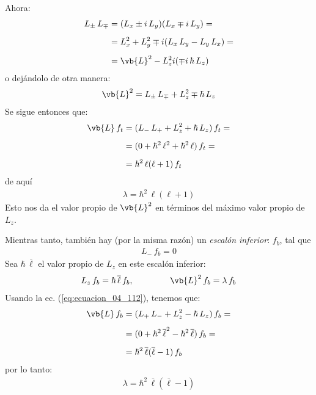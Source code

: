 Ahora:
\begin{align*}
L_{\pm} \, L_{\mp} &= (L_{x} \pm i \, L_{y})(L_{x} \mp i \, L_{y}) = \\[0.5em] 
&= L_{x}^{2} + L_{y}^{2} \mp i (L_{x} \, L_{y} - L_{y} \, L_{x}) = \\[0.5em]
&= \vb{L}^{2} - L_{z}^{2} i (\mp i \, \hbar \, L_{z})
\end{align*}
o dejándolo de otra manera:
\begin{align}
\vb{L}^{2} = L_{\pm} \, L_{\mp} + L_{z}^{2} \mp \hbar \, L_{z}
\label{eq:ecuacion_04_112}
\end{align}
Se sigue entonces que:
\begin{align*}
\vb{L} \, f_{t} &= (L_{-} \, L_{+} + L_{z}^{2} + \hbar \, L_{z}) \, f_{t} = \\[0.5em]
&= (0 + \hbar^{2} \, \ell^{2} + \hbar^{2} \, \ell) \, f_{t} = \\[0.5em]
&= \hbar^{2} \, \ell (\ell + 1) \, f_{t}
\end{align*}
de aquí
\begin{align}
\lambda = \hbar^{2} \, \ell (\ell + 1)
\label{eq:ecuacion_04_113}
\end{align}
Esto nos da el valor propio de $\vb{L}^{2}$ en términos del máximo valor propio de $L_{z}$.
\par
Mientras tanto, también hay (por la misma razón) un \emph{escalón inferior}: $f_{b}$, tal que
\begin{align}
L_{-} \, f_{b} = 0
\label{eq:ecuacion_04_114}
\end{align}
Sea $\hbar \, \overline{\ell}$ el valor propio de $L_{z}$ en este escalón inferior:
\begin{align}
L_{z} \, f_{b} = \hbar \, \overline{\ell} \, f_{b}, \hspace{1.5cm} \vb{L}^{2} \, f_{b} = \lambda \, f_{b}
\label{eq:ecuacion_04_115}
\end{align}
Usando la ec. (\ref{eq:ecuacion_04_112}), tenemos que:
\begin{align*}
\vb{L} \, f_{b} &= (L_{+} \, L_{-} + L_{z}^{2} - \hbar \, L_{z}) \, f_{b} = \\[0.5em]
&= (0 + \hbar^{2} \, \overline{\ell}^{2} - \hbar^{2} \, \overline{\ell}) \, f_{b} = \\[0.5em]
&= \hbar^{2} \, \overline{\ell} (\overline{\ell} - 1) \, f_{b}
\end{align*}
por lo tanto:
\begin{align}
\lambda = \hbar^{2} \, \overline{\ell} (\overline{\ell} - 1)
\label{eq:ecuacion_04_116}
\end{align}

